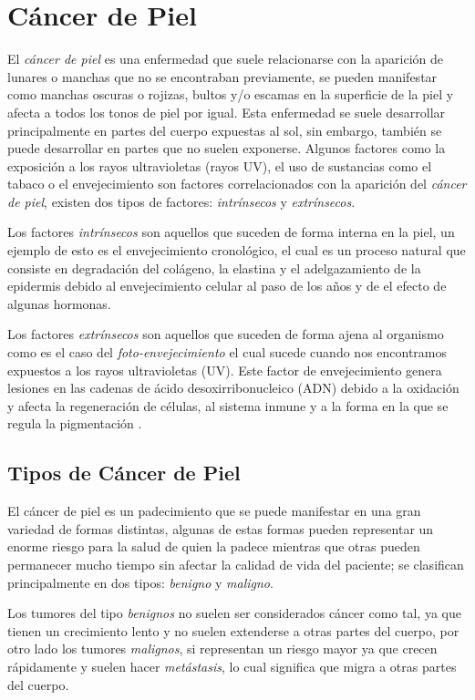 \section{Cáncer de Piel}
El \emph{cáncer de piel} es una enfermedad que suele relacionarse con la aparición de lunares o manchas que no se encontraban previamente, se pueden manifestar como manchas oscuras o rojizas, bultos y/o escamas en la superficie de la piel y afecta a todos los tonos de piel por igual. Esta enfermedad se suele desarrollar principalmente en partes del cuerpo expuestas al sol, sin embargo, también se puede desarrollar en partes que no suelen exponerse. Algunos factores como la exposición a los rayos ultravioletas (rayos UV), el uso de sustancias como el tabaco o el envejecimiento son factores correlacionados con la aparición del \emph{cáncer de piel}, existen dos tipos de factores: \emph{intrínsecos} y \emph{extrínsecos}.

Los factores \emph{intrínsecos} son aquellos que suceden de forma interna en la piel, un ejemplo de esto es el envejecimiento cronológico, el cual es un proceso natural que consiste en degradación del colágeno, la elastina y el adelgazamiento de la epidermis debido al envejecimiento celular al paso de los años y de el efecto de algunas hormonas.
\bigskip

Los factores \emph{extrínsecos} son aquellos que suceden de forma ajena al organismo como es el caso del \emph{foto-envejecimiento} el cual sucede cuando nos encontramos expuestos a los rayos ultravioletas (UV). Este factor de envejecimiento genera lesiones en las cadenas de ácido desoxirribonucleico (ADN) debido a la oxidación y afecta la regeneración de células, al sistema inmune y a la forma en la que se regula la pigmentación \citep{skin_aging}.

\subsection{Tipos de Cáncer de Piel}
El cáncer de piel es un padecimiento que se puede manifestar en una gran variedad de formas distintas, algunas de estas formas pueden representar un enorme riesgo para la salud de quien la padece mientras que otras pueden permanecer mucho tiempo sin afectar la calidad de vida del paciente; se clasifican principalmente en dos tipos: \emph{benigno} y \emph{maligno}.

Los tumores del tipo \emph{benignos} no suelen ser considerados cáncer como tal, ya que tienen un crecimiento lento y no suelen extenderse a otras partes del cuerpo, por otro lado los tumores \emph{malignos}, si representan un riesgo mayor ya que crecen rápidamente y suelen hacer \emph{metástasis}, lo cual significa que migra a otras partes del cuerpo.

